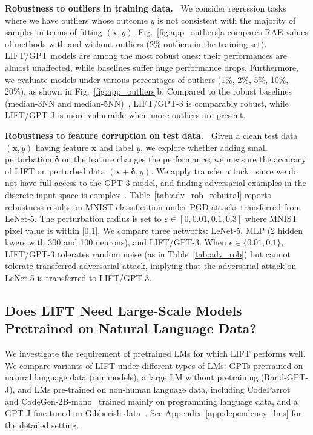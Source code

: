 \textbf{Robustness to outliers in training data.~}\label{sec:robutness:outlier}
We consider regression tasks where we have outliers whose outcome $y$ is not consistent with the majority of samples in terms of fitting $({\bm{x}}, y)$. 
Fig.~\ref{fig:app_outliers}a compares RAE values of methods with and without outliers (2\% outliers in the training set).
\textsc{LIFT}/GPT models are among the most robust ones: their performances are almost unaffected, while baselines suffer huge performance drops. Furthermore, we evaluate models under various percentages of outliers (1\%, 2\%, 5\%, 10\%, 20\%), as shown in Fig.~\ref{fig:app_outliers}b.
Compared to the robust baselines (median-3NN and median-5NN)~\citep{huber2011robust}, \textsc{LIFT}/GPT-3 is comparably robust, while \textsc{LIFT}/GPT-J is more vulnerable when more outliers are present.  

\textbf{Robustness to feature corruption on test data.~} Given a clean test data $({\bm{x}},y)$ having feature ${\bm{x}}$ and label $y$, we explore whether adding small perturbation $\boldsymbol{\delta}$ on the feature changes the performance; we measure the accuracy of \textsc{LIFT} on perturbed data $({\bm{x}}+\boldsymbol{\delta}, y)$. We apply transfer attack~\citep{kurakin2016adversarial} since we do not have full access to the GPT-3 model, and finding adversarial examples in the discrete input space is complex~\citep{zhang2020adversarial}.
Table~\ref{tab:adv_rob_rebuttal} reports robustness results on MNIST classification under PGD attacks transferred from LeNet-5. The perturbation radius is set to $\varepsilon \in [0, 0.01, 0.1, 0.3]$ where MNIST pixel value is within [0,1]. We compare three networks: LeNet-5, MLP (2 hidden layers with 300 and 100 neurons), and \textsc{LIFT}/GPT-3. 
When ${\epsilon} \in \{0.01, 0.1\}$, \textsc{LIFT}/GPT-3 tolerates random noise (as in Table~\ref{tab:adv_rob}) but cannot tolerate transferred adversarial attack, implying that the adversarial attack on LeNet-5 is transferred to \textsc{LIFT}/GPT-3.

\subsection{Does LIFT Need Large-Scale Models Pretrained on Natural Language Data?}
\label{sec:dependency_lms}

We investigate the requirement of pretrained LMs for which \textsc{LIFT}  performs well. We compare variants of \textsc{LIFT} under different types of LMs: GPTs pretrained on natural language data (our models), a large LM without pretraining (Rand-GPT-J), and LMs pre-trained on non-human language data, including CodeParrot~\citep{codeparrot} and CodeGen-2B-mono~\citep{nijkamp2022conversational} trained mainly on programming language data, and a GPT-J fine-tuned on Gibberish data~\citep{gibberish}. See Appendix~\ref{app:dependency_lms} for the detailed setting.


